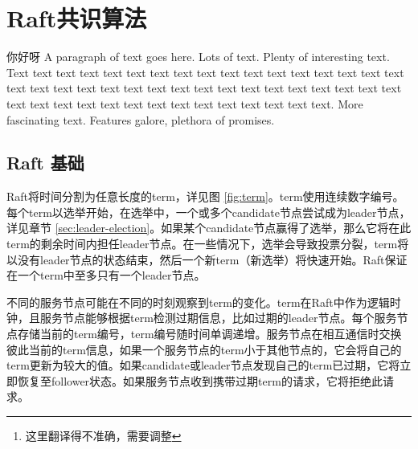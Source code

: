 \maketitle

\begin{abstract}
Raft是一种管理复制日志的共识算法，它提供了和(multi-)Paxos等效的结果，且它和Paxos一样有效，但结构不同于Paxos，这使得Raft更易理解，且能够为构建实际系统提供更好的基础。为了提高可理解性，Raft将共识划分为Leader选举、日志复制及安全性等核心模块，并且它加强了一致性以减少需要考虑的状态。用户研究表明，对于学生而言，Raft相交于Paxos更易理解。Raft还提供了一种用于改变集群成员的新机制，其使用重叠大多数（overlapping majorities）\footnote{这里翻译得不准确，需要调整}来保证安全性。
\end{abstract}

\section{Raft共识算法}

你好呀
A paragraph of text goes here. Lots of text. Plenty of interesting
text. Text text text text text text text text text text text text text
text text text text text text text text text text text text text text
text text text text text text text text text text text text text text
text text text text text text text.
More fascinating text. Features galore, plethora of promises.

\subsection{Raft 基础}

Raft将时间分割为任意长度的term，详见图 \ref{fig:term}。term使用连续数字编号。每个term以选举开始，在选举中，一个或多个candidate节点尝试成为leader节点，详见章节 \ref{sec:leader-election}。如果某个candidate节点赢得了选举，那么它将在此term的剩余时间内担任leader节点。在一些情况下，选举会导致投票分裂，term将以没有leader节点的状态结束，然后一个新term（新选举）将快速开始。Raft保证在一个term中至多只有一个leader节点。

不同的服务节点可能在不同的时刻观察到term的变化。term在Raft中作为逻辑时钟\cite{10.1145/3335772.3335934}，且服务节点能够根据term检测过期信息，比如过期的leader节点。每个服务节点存储当前的term编号，term编号随时间单调递增。服务节点在相互通信时交换彼此当前的term信息，如果一个服务节点的term小于其他节点的，它会将自己的term更新为较大的值。如果candidate或leader节点发现自己的term已过期，它将立即恢复至follower状态。如果服务节点收到携带过期term的请求，它将拒绝此请求。


